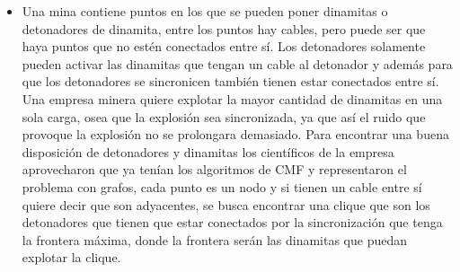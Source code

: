 \begin{itemize}
\item Una mina contiene puntos en los que se pueden poner dinamitas o detonadores de dinamita, entre los puntos hay cables, pero puede ser que haya puntos que no estén conectados entre sí. Los detonadores solamente pueden activar las dinamitas que tengan un cable al detonador y además para que los detonadores se sincronicen también tienen
estar conectados entre sí. Una empresa minera quiere explotar la mayor cantidad de dinamitas en una sola carga, osea que la explosión sea sincronizada, ya que así el ruido que provoque la explosión no se prolongara demasiado. Para encontrar una buena disposición de detonadores y dinamitas los científicos de la empresa aprovecharon que ya tenían los algoritmos de CMF y representaron el problema con grafos, cada punto es un nodo y si tienen un cable entre sí quiere decir que son adyacentes, se busca encontrar una clique que son los detonadores que tienen que estar conectados por la sincronización que tenga la frontera máxima, donde la frontera serán las dinamitas que puedan explotar la clique. 
 

\end{itemize}


